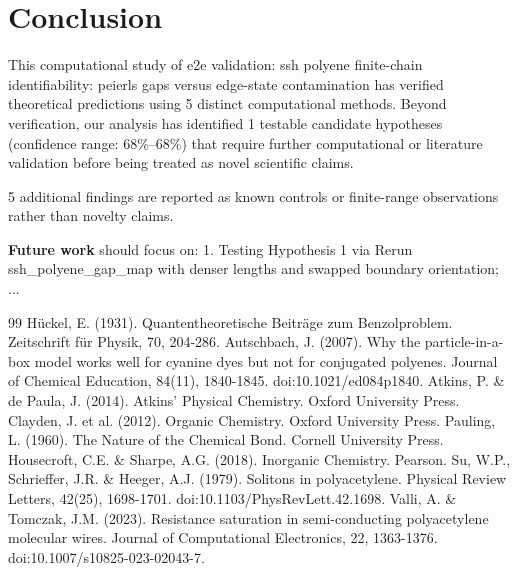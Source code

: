 \documentclass[11pt,a4paper]{article}
\begin{document}
\section{Conclusion}
This computational study of e2e validation: ssh polyene finite-chain identifiability: peierls gaps versus edge-state contamination has verified theoretical predictions using 5 distinct computational methods. Beyond verification, our analysis has identified 1 testable candidate hypotheses (confidence range: 68\%–68\%) that require further computational or literature validation before being treated as novel scientific claims.

5 additional findings are reported as known controls or finite-range observations rather than novelty claims.

\textbf{Future work} should focus on:
1. Testing Hypothesis 1 via Rerun ssh\_polyene\_gap\_map with denser lengths and swapped boundary orientation; ...


\begin{thebibliography}{99}
 Hückel, E. (1931). Quantentheoretische Beiträge zum Benzolproblem. Zeitschrift für Physik, 70, 204-286.
 Autschbach, J. (2007). Why the particle-in-a-box model works well for cyanine dyes but not for conjugated polyenes. Journal of Chemical Education, 84(11), 1840-1845. doi:10.1021/ed084p1840.
 Atkins, P. \& de Paula, J. (2014). Atkins' Physical Chemistry. Oxford University Press.
 Clayden, J. et al. (2012). Organic Chemistry. Oxford University Press.
 Pauling, L. (1960). The Nature of the Chemical Bond. Cornell University Press.
 Housecroft, C.E. \& Sharpe, A.G. (2018). Inorganic Chemistry. Pearson.
 Su, W.P., Schrieffer, J.R. \& Heeger, A.J. (1979). Solitons in polyacetylene. Physical Review Letters, 42(25), 1698-1701. doi:10.1103/PhysRevLett.42.1698.
 Valli, A. \& Tomczak, J.M. (2023). Resistance saturation in semi-conducting polyacetylene molecular wires. Journal of Computational Electronics, 22, 1363-1376. doi:10.1007/s10825-023-02043-7.
\end{thebibliography}
\end{document}
